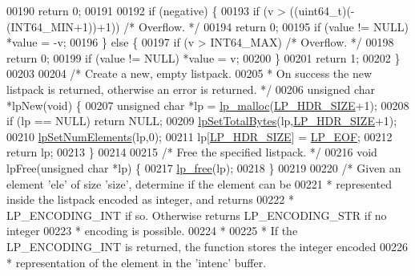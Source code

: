 \begin{DoxyCode}
00190         \textcolor{keywordflow}{return} 0;
00191 
00192     \textcolor{keywordflow}{if} (negative) \{
00193         \textcolor{keywordflow}{if} (v > ((uint64\_t)(-(INT64\_MIN+1))+1)) \textcolor{comment}{/* Overflow. */}
00194             \textcolor{keywordflow}{return} 0;
00195         \textcolor{keywordflow}{if} (value != NULL) *value = -v;
00196     \} \textcolor{keywordflow}{else} \{
00197         \textcolor{keywordflow}{if} (v > INT64\_MAX) \textcolor{comment}{/* Overflow. */}
00198             \textcolor{keywordflow}{return} 0;
00199         \textcolor{keywordflow}{if} (value != NULL) *value = v;
00200     \}
00201     \textcolor{keywordflow}{return} 1;
00202 \}
00203 
00204 \textcolor{comment}{/* Create a new, empty listpack.}
00205 \textcolor{comment}{ * On success the new listpack is returned, otherwise an error is returned. */}
00206 \textcolor{keywordtype}{unsigned} \textcolor{keywordtype}{char} *lpNew(\textcolor{keywordtype}{void}) \{
00207     \textcolor{keywordtype}{unsigned} \textcolor{keywordtype}{char} *lp = \hyperlink{listpack__malloc_8h_ac3f4fb45221bef8d11ffe40df4ee0e31}{lp\_malloc}(\hyperlink{listpack_8c_aa3fb94110f69a73ee90b4e63d8524dba}{LP\_HDR\_SIZE}+1);
00208     \textcolor{keywordflow}{if} (lp == NULL) \textcolor{keywordflow}{return} NULL;
00209     \hyperlink{listpack_8c_a08a4fb5c67c9c38aa657ba8773b7e1ab}{lpSetTotalBytes}(lp,\hyperlink{listpack_8c_aa3fb94110f69a73ee90b4e63d8524dba}{LP\_HDR\_SIZE}+1);
00210     \hyperlink{listpack_8c_abd63c5b3f66f6d270759fa5e3c319ce8}{lpSetNumElements}(lp,0);
00211     lp[\hyperlink{listpack_8c_aa3fb94110f69a73ee90b4e63d8524dba}{LP\_HDR\_SIZE}] = \hyperlink{listpack_8c_aa11b422dc597c4352da2abf522692774}{LP\_EOF};
00212     \textcolor{keywordflow}{return} lp;
00213 \}
00214 
00215 \textcolor{comment}{/* Free the specified listpack. */}
00216 \textcolor{keywordtype}{void} lpFree(\textcolor{keywordtype}{unsigned} \textcolor{keywordtype}{char} *lp) \{
00217     \hyperlink{listpack__malloc_8h_a395418499fa2976813d30cc739180199}{lp\_free}(lp);
00218 \}
00219 
00220 \textcolor{comment}{/* Given an element 'ele' of size 'size', determine if the element can be}
00221 \textcolor{comment}{ * represented inside the listpack encoded as integer, and returns}
00222 \textcolor{comment}{ * LP\_ENCODING\_INT if so. Otherwise returns LP\_ENCODING\_STR if no integer}
00223 \textcolor{comment}{ * encoding is possible.}
00224 \textcolor{comment}{ *}
00225 \textcolor{comment}{ * If the LP\_ENCODING\_INT is returned, the function stores the integer encoded}
00226 \textcolor{comment}{ * representation of the element in the 'intenc' buffer.}

\end{DoxyCode}
